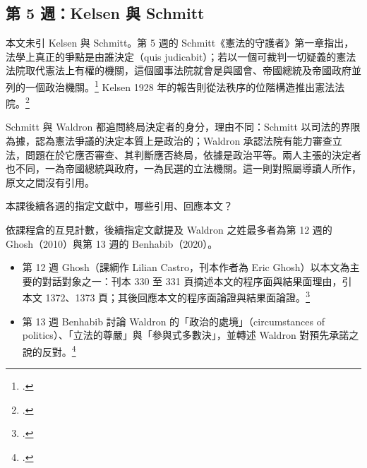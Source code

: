 \subsection{第 5 週：Kelsen 與 Schmitt}

本文未引 Kelsen 與 Schmitt。第 5 週的 Schmitt《憲法的守護者》第一章指出，法學上真正的爭點是由誰決定（quis judicabit）；若以一個可裁判一切疑義的憲法法院取代憲法上有權的機關，這個國事法院就會是與國會、帝國總統及帝國政府並列的一個政治機關。\footcite[100--101]{vinx2015} Kelsen 1928 年的報告則從法秩序的位階構造推出憲法法院。\footcite[22--78]{vinx2015}

\begin{readernote}
Schmitt 與 Waldron 都追問終局決定者的身分，理由不同：Schmitt 以司法的界限為據，認為憲法爭議的決定本質上是政治的；Waldron 承認法院有能力審查立法，問題在於它應否審查、其判斷應否終局，依據是政治平等。兩人主張的決定者也不同，一為帝國總統與政府，一為民選的立法機關。這一則對照屬導讀人所作，原文之間沒有引用。
\end{readernote}


\begin{qaquestion}
本課後續各週的指定文獻中，哪些引用、回應本文？
\end{qaquestion}

依課程倉的互見計數，後續指定文獻提及 Waldron 之姓最多者為第 12 週的 Ghosh（2010）與第 13 週的 Benhabib（2020）。

\begin{itemize}
\item 第 12 週 Ghosh（課綱作 Lilian Castro，刊本作者為 Eric Ghosh）以本文為主要的對話對象之一：刊本 330 至 331 頁摘述本文的程序面與結果面理由，引本文 1372、1373 頁；其後回應本文的程序面論證與結果面論證。\footcite{ghosh2010}
\item 第 13 週 Benhabib 討論 Waldron 的「政治的處境」（circumstances of politics）、「立法的尊嚴」與「參與式多數決」，並轉述 Waldron 對預先承諾之說的反對。\footcite[509--513]{benhabib2020}
\end{itemize}
